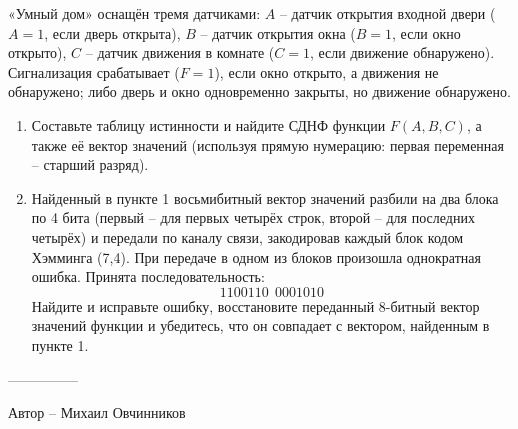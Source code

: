 \question
«Умный дом» оснащён тремя датчиками: $A$ -- датчик открытия входной двери ($A=1$, если дверь открыта), $B$ -- датчик открытия окна ($B=1$, если окно открыто), $C$ -- датчик движения в комнате ($C=1$, если движение обнаружено). Сигнализация срабатывает ($F=1$), если окно открыто, а движения не обнаружено; либо дверь и окно одновременно закрыты, но движение обнаружено.

\begin{enumerate}
\item Составьте таблицу истинности и найдите СДНФ функции $F(A,B,C)$, а также её вектор значений (используя прямую нумерацию: первая переменная -- старший разряд).
\item Найденный в пункте 1 восьмибитный вектор значений разбили на два блока по 4 бита (первый -- для первых четырёх строк, второй -- для последних четырёх) и передали по каналу связи, закодировав каждый блок кодом Хэмминга (7,4). При передаче в одном из блоков произошла однократная ошибка. Принята последовательность:
\[
1100110\ \ 0001010
\]
Найдите и исправьте ошибку, восстановите переданный 8-битный вектор значений функции и убедитесь, что он совпадает с вектором, найденным в пункте 1.
\end{enumerate}
---------------

Автор -- Михаил Овчинников